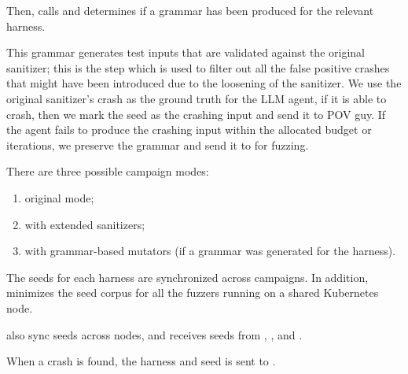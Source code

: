 Then, \jazzmine calls \grammarguy and determines if a grammar has been produced for the relevant harness.


This grammar generates test inputs that are validated against the original sanitizer; this is the step which is used to filter out all the false positive crashes that might have been introduced due to the loosening of the sanitizer. We use the original sanitizer's crash as the ground truth for the LLM agent, if it is able to crash, then we mark the seed as the crashing input and send it to POV guy. If the agent fails to produce the crashing input within the allocated budget or iterations, we preserve the grammar and send it to \revolver for fuzzing.

There are three possible campaign modes:

\begin{enumerate}
\item original mode;
\item with extended sanitizers;
\item with grammar-based mutators (if a grammar was generated for the harness).
\end{enumerate}

The seeds for each harness are synchronized across campaigns. 
In addition, \jazzmine minimizes the seed corpus for all the fuzzers running on a shared Kubernetes node.

\jazzmine also sync seeds across nodes, and receives seeds from \grammarguy, \quickseed, and \discoveryguy.


When a crash is found, the harness and seed is sent to \povguy.














